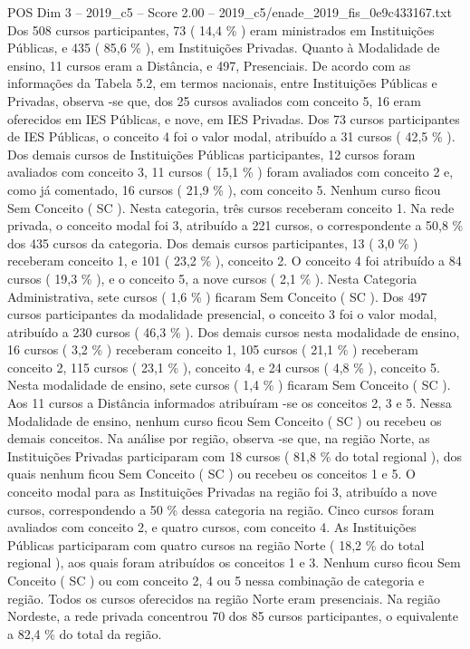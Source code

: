 \begin{textsample}{POS Dim 3 – 2019\_c5 – Score 2.00 – 2019\_c5/enade\_2019\_fis\_0e9c433167.txt}
Dos 508 cursos participantes, 73 ( 14,4 \% ) eram ministrados em Instituições Públicas, e 435 ( 85,6 \% ), em Instituições Privadas.
Quanto à Modalidade de ensino, 11 cursos eram a Distância, e 497, Presenciais.
De acordo com as informações da Tabela 5.2, em termos nacionais, entre Instituições Públicas e Privadas, observa -se que, dos 25 cursos avaliados com conceito 5, 16 eram oferecidos em IES Públicas, e nove, em IES Privadas.
Dos 73 cursos participantes de IES Públicas, o conceito 4 foi o valor modal, atribuído a 31 cursos ( 42,5 \% ).
Dos demais cursos de Instituições Públicas participantes, 12 cursos foram avaliados com conceito 3, 11 cursos ( 15,1 \% ) foram avaliados com conceito 2 e, como já comentado, 16 cursos ( 21,9 \% ), com conceito 5.
Nenhum curso ficou Sem Conceito ( SC ).
Nesta categoria, três cursos receberam conceito 1.
Na rede privada, o conceito modal foi 3, atribuído a 221 cursos, o correspondente a 50,8 \% dos 435 cursos da categoria.
Dos demais cursos participantes, 13 ( 3,0 \% ) receberam conceito 1, e 101 ( 23,2 \% ), conceito 2.
O conceito 4 foi atribuído a 84 cursos ( 19,3 \% ), e o conceito 5, a nove cursos ( 2,1 \% ).
Nesta Categoria Administrativa, sete cursos ( 1,6 \% ) ficaram Sem Conceito ( SC ).
Dos 497 cursos participantes da modalidade presencial, o conceito 3 foi o valor modal, atribuído a 230 cursos ( 46,3 \% ).
Dos demais cursos nesta modalidade de ensino, 16 cursos ( 3,2 \% ) receberam conceito 1, 105 cursos ( 21,1 \% ) receberam conceito 2, 115 cursos ( 23,1 \% ), conceito 4, e 24 cursos ( 4,8 \% ), conceito 5.
Nesta modalidade de ensino, sete cursos ( 1,4 \% ) ficaram Sem Conceito ( SC ).
Aos 11 cursos a Distância informados atribuíram -se os conceitos 2, 3 e 5.
Nessa Modalidade de ensino, nenhum curso ficou Sem Conceito ( SC ) ou recebeu os demais conceitos.
Na análise por região, observa -se que, na região Norte, as Instituições Privadas participaram com 18 cursos ( 81,8 \% do total regional ), dos quais nenhum ficou Sem Conceito ( SC ) ou recebeu os conceitos 1 e 5.
O conceito modal para as Instituições Privadas na região foi 3, atribuído a nove cursos, correspondendo a 50 \% dessa categoria na região.
Cinco cursos foram avaliados com conceito 2, e quatro cursos, com conceito 4.
As Instituições Públicas participaram com quatro cursos na região Norte ( 18,2 \% do total regional ), aos quais foram atribuídos os conceitos 1 e 3.
Nenhum curso ficou Sem Conceito ( SC ) ou com conceito 2, 4 ou 5 nessa combinação de categoria e região.
Todos os cursos oferecidos na região Norte eram presenciais.
Na região Nordeste, a rede privada concentrou 70 dos 85 cursos participantes, o equivalente a 82,4 \% do total da região.

\end{textsample}
